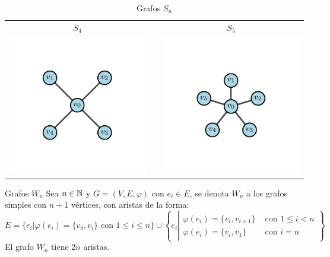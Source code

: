 \begin{table}[H]
\begin{center}
\begin{tabular}{ccc}
                    \\
                    \textbf{$S_4$} &  & \textbf{$S_5$} \\
                    \includegraphics{Sections/Graphs/GraphsImages/GraphsSn/S4.pdf}
                    &
                    &
                    \includegraphics{Sections/Graphs/GraphsImages/GraphsSn/S5.pdf}
                \end{tabular}
              \caption{Grafos $S_n$}
              \label{tbl:grafosTn}
            \end{center}
        \end{table}
        \begin{definition}{Grafos $W_n$}
            Sea $n\in\mathbb{N}$ y $G=(V,E,\varphi)$ con $e_i\in E$, se denota $W_n$ a los grafos simples con $n+1$ vértices, con aristas de la forma:
            \[
                E=\{e_i|\varphi(e_i)=\{v_0,v_i\}\text{ con }1\le i\le n\}\cup
                \left\{e_i\left|
                    \begin{array}{cl}
                        \varphi(e_i)=\{v_i,v_{i+1}\} & \text{ con }1\le i<n \\ 
                        \varphi(e_i)=\{v_i,v_1\} & \text{ con }i=n 
                    \end{array} 
                \right.\right\}
            \]
            El grafo $W_n$ tiene $2n$ aristas.
        \end{definition}
